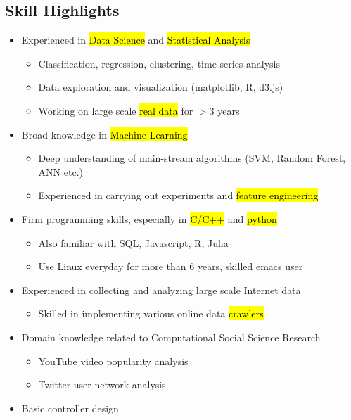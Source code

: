 \begin{resume}
\section{Skill Highlights}
\begin{itemize}
\item Experienced in \hl{Data Science} and \hl{Statistical Analysis}
  \begin{itemize}
  \item Classification, regression, clustering, time series analysis
  \item Data exploration and visualization (matplotlib, R, d3.js)
  \item Working on large scale \hl{real data} for $>$3 years
  \end{itemize}
\item Broad knowledge in \hl{Machine Learning}
  \begin{itemize}
  \item Deep understanding of main-stream algorithms (SVM, Random Forest, ANN etc.)
  \item Experienced in carrying out experiments and \hl{feature engineering}
  \end{itemize}
\item Firm programming skills, especially in \hl{C/C++} and \hl{python}
  \begin{itemize}
    \item Also familiar with SQL, Javascript, R, Julia
    \item Use Linux everyday for more than 6 years, skilled emacs user
  \end{itemize}      
\item Experienced in collecting and analyzing large scale Internet data
  \begin{itemize}
    \item Skilled in implementing various online data \hl{crawlers}
    \end{itemize}
\item Domain knowledge related to Computational Social Science Research
  \begin{itemize}
  \item YouTube video popularity analysis
  \item Twitter user network analysis
  \end{itemize}
\item  Basic controller design
\end{itemize}



\end{resume}
